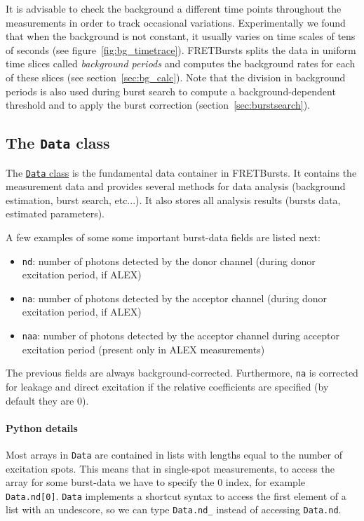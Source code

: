 It is advisable to check the background a different time points
throughout the measurements in order to track occasional variations.
Experimentally we found that when the background is not constant,
it usually varies
on time scales of tens of seconds (see figure~\ref{fig:bg_timetrace}).
FRETBursts splits the data in uniform time
slices called \textit{background periods} and computes the background rates for
each of these slices (see section~\ref{sec:bg_calc}).
Note that the division in background periods is also used during
burst search to compute a background-dependent
threshold and to apply the burst correction (section~\ref{sec:burstsearch}).

\subsection{The \texttt{Data} class}
\label{sec:data_intro}

The
\href{http://fretbursts.readthedocs.org/en/latest/data_class.html}{\texttt{Data}
class} is the fundamental data container in FRETBursts. It contains the
measurement data and provides several methods for data analysis (background
estimation, burst search, etc...). It also stores all analysis results
(bursts data, estimated parameters).

A few examples of some some important burst-data fields are listed next:

\begin{itemize}
\item \verb|nd|: number of photons detected by the donor channel
(during donor excitation period, if ALEX)
\item \verb|na|: number of photons detected by the acceptor channel
(during donor excitation period, if ALEX)
\item \verb|naa|: number of photons detected by the acceptor channel
during acceptor excitation period (present only in ALEX measurements)
\end{itemize}

The previous fields are always background-corrected. Furthermore,
\verb|na| is corrected for leakage and direct excitation if the
relative coefficients are specified (by default they are 0).

\paragraph{Python details}

Most arrays in \texttt{Data} are contained in lists with lengths equal to the
number of excitation spots. This means that in
single-spot measurements, to access the array for some burst-data
we have to specify the 0 index, for example \verb|Data.nd[0]|.
\verb|Data| implements a shortcut syntax to access the first element of a list
with an undescore, so we can type
\verb|Data.nd_| instead of accessing \verb|Data.nd|.

